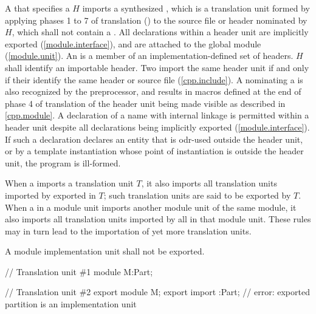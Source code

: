 \begin{std.txt}
  \pnum
  A  that specifies
  a  $H$ imports
  a synthesized ,
  which is a translation unit formed by applying
  phases 1 to 7 of translation ()
  to the source file or header nominated by $H$,
  which shall not contain a .
  \enternote
  All declarations within a header unit are implicitly
  exported (\ref{module.interface}),
  and are attached to the global module (\ref{module.unit}).
  \exitnote
  An  is a member of an
  implementation-defined set of headers.
  $H$ shall identify an importable header.
  Two
  import the same header unit if and only if
  their  identify the same
  header or source file (\ref{cpp.include}).
  \enternote
  A  nominating
  a  is also recognized by the
  preprocessor, and results in macros defined at the
  end of phase 4 of translation of the header unit
  being made visible as described in \ref{cpp.module}.
  \exitnote
  A declaration of a name with internal linkage is
  permitted within a header unit despite all
  declarations being implicitly exported (\ref{module.interface}).
  If such a declaration declares an entity
  that is odr-used outside the
  header unit, or by a template
  instantiation whose point of instantiation is outside
  the header unit, the program is ill-formed.

  \pnum
  When a  imports
  a translation unit $T$, it also imports
  all translation units imported by
  exported 
  in $T$; such translation units are
  said to be exported by $T$.
  When a  in a module unit imports
  another module unit of the same module, it also imports
  all translation units imported by
  all 
  in that module unit.
  These rules may in turn lead to the importation of yet more
  translation units.

  \pnum
  \color{addclr}
  A module implementation unit shall not be exported.
  \begin{example}
  \begin{Program}
// Translation unit \#1
module M:Part;

// Translation unit \#2
export module M;
export import :Part;    // error: exported partition  is an implementation unit
  \end{Program}
  \end{example}


\end{std.txt}
